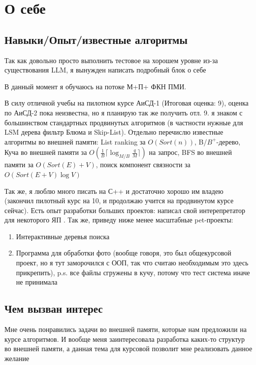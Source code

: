\section{О себе}
\subsection{Навыки/Опыт/известные алгоритмы}
Так как довольно просто выполнить тестовое на хорошем уровне из-за существования LLM, я вынужден написать подробный блок о себе

В данный момент я обучаюсь на потоке М+П+ ФКН ПМИ.

В силу отличной учебы на пилотном курсе АиСД-1 (Итоговая оценка: 9), оценка по АиСД-2 пока неизвестна, но я планирую так же получить отл. 9. я знаком с большинством стандартных продвинутых алгоритмов (в частности нужные для LSM дерева фильтр Блюма и Skip-List). Отдельно перечислю известные алгоритмы во внешней памяти: List ranking за $O(Sort(n))$, B/$B^+$-дерево, Куча во внешней памяти за $O(\frac1B \lceil \log_{M/B} \frac{q}{M} \rceil)$ на запрос, BFS во внешней памяти за $O(Sort(E) + V)$, поиск компонент связности за $O(Sort(E+V)\log V)$

Так же, я люблю много писать на С++ и достаточно хорошо им владею (закончил пилотный курс на 10, и продолжаю учится на продвинутом курсе сейчас). Есть опыт разработки больших проектов: написал свой интерепретатор для некоторого ЯП \cite{interpretator}. Так же, приведу ниже менее масштабные pet-проекты:

\begin{enumerate}
    \item Интерактивные деревья поиска \cite{bstgarden}
    \item Программа для обработки фото \cite{imageprocessor} (вообще говоря, это был общекурсовой проект, но я тут заморочился с ООП, так что считаю необходимым это здесь прикрепить), p.s. все файлы сгружены в кучу, потому что тест система иначе не принимала
\end{enumerate}


\subsection{Чем вызван интерес}

Мне очень понравились задачи во внешней памяти, которые нам предложили на курсе алгоритмов. И вообще меня заинтересовала разработка каких-то структур во внешней памяти, а данная тема для курсовой позволит мне реализовать данное желание
